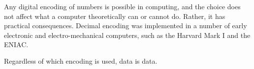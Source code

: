 \begin{tcolorbox}[breakable, enhanced, colback=textbook-blue, sharp corners]
	\begin{center}
	\end{center}
	
	
	Any digital encoding of numbers is possible in computing, and the choice does not affect what a computer theoretically can or cannot do. Rather, it has practical consequences. Decimal encoding was implemented in a number of early electronic and electro-mechanical computers, such as the Harvard Mark I and the ENIAC. 
	
	
	
	\vspace{1mm}
\end{tcolorbox}
\vspace{7mm}



Regardless of which encoding is used, data is data.




